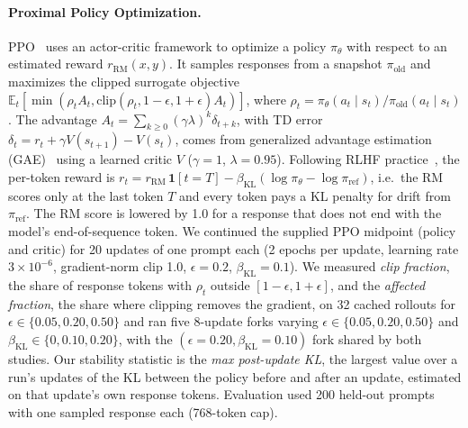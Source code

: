 \documentclass{article}
\begin{document}
\paragraph{Proximal Policy Optimization.} PPO~\citep{schulman2017ppo} uses an actor-critic framework to optimize a policy $\pi_\theta$ with respect to an estimated reward $r_{\text{RM}}(x, y)$. It samples responses from a snapshot $\pi_{\text{old}}$ and maximizes the clipped surrogate objective $\mathbb{E}_t[\min(\rho_t A_t, \mathrm{clip}(\rho_t, 1-\epsilon, 1+\epsilon)A_t)]$, where $\rho_t = \pi_\theta(a_t \mid s_t)/\pi_{\text{old}}(a_t \mid s_t)$. The advantage $A_t = \sum_{k \ge 0}(\gamma\lambda)^k \delta_{t+k}$, with TD error $\delta_t = r_t + \gamma V(s_{t+1}) - V(s_t)$, comes from generalized advantage estimation (GAE)~\citep{schulman2016gae} using a learned critic $V$ ($\gamma = 1$, $\lambda = 0.95$). Following RLHF practice~\citep{ouyang2022instructgpt}, the per-token reward is $r_t = r_{\text{RM}}\,\mathbf{1}[t{=}T] - \beta_{\text{KL}}(\log\pi_\theta - \log\pi_{\text{ref}})$, i.e.\ the RM scores only at the last token $T$ and every token pays a KL penalty for drift from $\pi_{\text{ref}}$. The RM score is lowered by 1.0 for a response that does not end with the model's end-of-sequence token. We continued the supplied PPO midpoint (policy and critic) for 20 updates of one prompt each (2 epochs per update, learning rate $3{\times}10^{-6}$, gradient-norm clip 1.0, $\epsilon = 0.2$, $\beta_{\text{KL}} = 0.1$). We measured \emph{clip fraction}, the share of response tokens with $\rho_t$ outside $[1{-}\epsilon, 1{+}\epsilon]$, and the \emph{affected fraction}, the share where clipping removes the gradient, on 32 cached rollouts for $\epsilon \in \{0.05, 0.20, 0.50\}$ and ran five 8-update forks varying $\epsilon \in \{0.05, 0.20, 0.50\}$ and $\beta_{\text{KL}} \in \{0, 0.10, 0.20\}$, with the $(\epsilon{=}0.20, \beta_{\text{KL}}{=}0.10)$ fork shared by both studies. Our stability statistic is the \emph{max post-update KL}, the largest value over a run's updates of the KL between the policy before and after an update, estimated on that update's own response tokens. Evaluation used 200 held-out prompts with one sampled response each (768-token cap).
\end{document}
